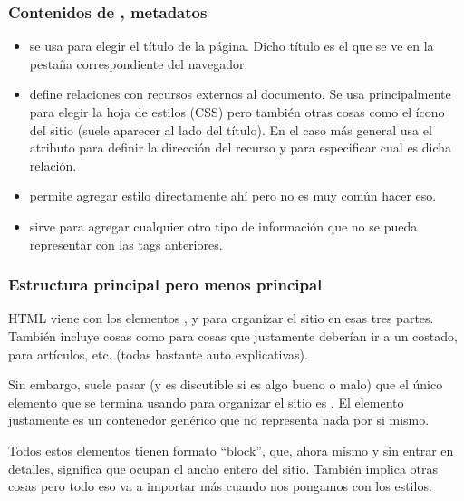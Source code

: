 \begin{frame}[fragile]
    \frametitle{Contenidos de , metadatos}
    
    \begin{itemize}
        \item {} se usa para elegir el título de la página. Dicho 
              título es el que se ve en la pestaña correspondiente del navegador.
        \item {} define relaciones con recursos externos al documento. 
              Se usa principalmente para elegir la hoja de estilos (CSS) pero 
              también otras cosas como el ícono del sitio (suele aparecer al 
              lado del título). En el caso más general usa el atributo 
               para definir la dirección del recurso y  para 
              especificar cual es dicha relación.
        \item {} permite agregar estilo directamente ahí pero no es muy 
              común hacer eso.
        \item {} sirve para agregar cualquier otro tipo de información 
              que no se pueda representar con las tags anteriores.
    \end{itemize}

\end{frame}

\begin{frame}[fragile]
    \frametitle{Estructura principal pero menos principal}

    HTML viene con los elementos ,  y  para 
    organizar el sitio en esas tres partes. También incluye cosas como  
    para cosas que justamente deberían ir a un costado,  para artículos, 
    etc. (todas bastante auto explicativas).
    
    Sin embargo, suele pasar (y es discutible si es algo bueno o malo) que el único 
    elemento que se termina usando para organizar el sitio es . El elemento 
    justamente es un contenedor genérico que no representa nada por si mismo.

    Todos estos elementos tienen formato ``block'', que, ahora mismo y sin entrar 
    en detalles, significa que ocupan el ancho entero del sitio. También implica otras 
    cosas pero todo eso va a importar más cuando nos pongamos con los estilos.

\end{frame}

